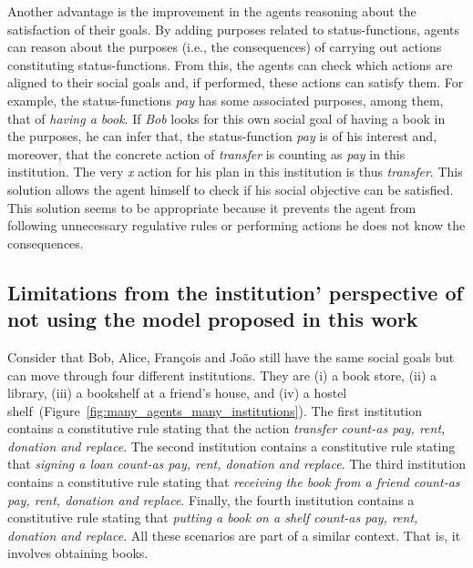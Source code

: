 \documentclass[runningheads]{llncs}
\begin{document}
Another advantage is the improvement in the agents reasoning about the satisfaction of their goals. By adding purposes related to status-functions, agents can reason about the purposes (i.e., the consequences) of carrying out actions constituting status-functions. From this, the agents can check which actions are aligned to their social goals and, if performed, these actions can satisfy them.
For example, the status-functions \emph{pay} has some associated purposes, among them, that of \emph{having a book}. If \emph{Bob} looks for this own social goal of having a book in the purposes, he can infer that, the status-function \emph{pay} is of his interest and, moreover, that the concrete action of \emph{transfer} is counting as \emph{pay} in this institution. The very \emph{x} action for his plan in this institution is thus \emph{transfer}.
This solution allows the agent himself to check if his social objective can be satisfied. This solution seems to be appropriate because it prevents the agent from following unnecessary regulative rules or performing actions he does not know the consequences.


\subsection{Limitations from the institution' perspective of not using the model proposed in this work}
\label{institution_limitation}



Consider that Bob, Alice, François and João still have the same social goals but can move through four different institutions. They are (i) a book store, (ii) a library, (iii) a bookshelf at a friend's house, and (iv) a hostel shelf~(Figure~\ref{fig:many_agents_many_institutions}).
The first institution contains a constitutive rule stating that the action \emph{transfer count-as pay, rent, donation and replace}.
The second institution contains a constitutive rule stating that \emph{signing a loan count-as pay, rent, donation and replace}. The third institution contains a constitutive rule stating that \emph{receiving the book from a friend count-as pay, rent, donation and replace}. Finally, the fourth institution contains a constitutive rule stating that \emph{putting a book on a shelf count-as pay, rent, donation and replace}. All these scenarios are part of a similar context. That is, it involves obtaining books.
\end{document}
